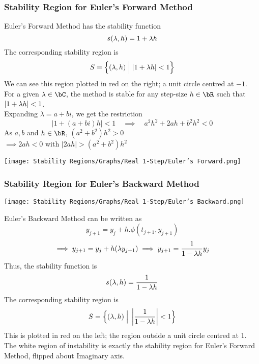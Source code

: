 \subsubsection{Stability Region for Euler's Forward Method}
\begin{multicols}{2}
\vspace*{\fill}

Euler's Forward Method has the stability function
\[s(\lambda, h) = 1 + \lambda h\]
The corresponding stability region is 
\[S = \Big\{ (\lambda, h) \;\Big|\; |1 + \lambda h| < 1\Big\}\]
We can see this region plotted in red on the right; a unit circle centred at $-1$.\\
For a given $\lambda \in \bC$, the method is stable for any step-size $h \in \bR$ such that $|1 + \lambda h| < 1$.\\
Expanding $\lambda = a + bi$, we get the restriction
\[|1 + (a + bi)h| < 1 \quad \implies \quad a^2h^2 + 2ah + b^2h^2 < 0\]
As $a, b$ and $h \in \bR$, $(a^2 +b^2)h^2 > 0$\\
$\implies 2ah < 0$ with $|2ah| > (a^2 + b^2)h^2$

\vspace*{\fill}
\columnbreak{}
\begin{center}
\texttt{[image: Stability Regions/Graphs/Real 1-Step/Euler's Forward.png]}
\end{center}
\end{multicols}

\subsubsection{Stability Region for Euler's Backward Method}
\begin{multicols}{2}
\begin{center}
\texttt{[image: Stability Regions/Graphs/Real 1-Step/Euler's Backward.png]}
\end{center}
\columnbreak{}
\vspace*{\fill}

Euler's Backward Method can be written as
\[y_{j+1} = y_j + h.\phi(t_{j+1}, y_{j+1})\]
\[\implies y_{j+1} = y_j + h(\lambda y_{j+1}) \implies y_{j+1} = \frac{1}{1 - \lambda h}y_j\]
Thus, the stability function is
\[s(\lambda, h) = \frac{1}{1 - \lambda h}\]
The corresponding stability region is
\[S = \Big\{ (\lambda, h) \;\Big|\; \left|\frac{1}{1 - \lambda h}\right| < 1\Big\}\]
This is plotted in red on the left; the region outside a unit circle centred at $1$.\\
The white region of instability is exactly the stability region for Euler's Forward Method, flipped about Imaginary axis.\\
\vspace*{\fill}
\end{multicols}

